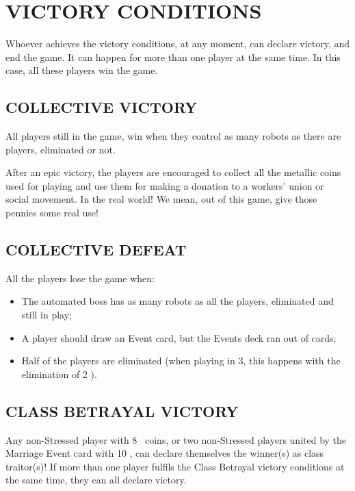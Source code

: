 \section{VICTORY CONDITIONS}

    Whoever achieves the victory conditions, at any moment, can declare victory,
    and end the game. It can happen for more than one player at the same time. In
    this case, all these players win the game.

    \subsection{COLLECTIVE VICTORY}
    
        All players still in the game, win when they control as many robots as there are
        players, eliminated or not.

        After an epic victory, the players are encouraged to collect all the metallic coins
        used for playing and use them for making a donation to a workers' union or social
        movement. In the real world! We mean, out of this game, give those pennies
        some real use!
    
    \subsection{COLLECTIVE DEFEAT}
    
        All the players lose the game when:
        \begin{itemize}
            \item The automated boss has as many robots as all the players, eliminated
            and still in play;
            \item A player should draw an Event card, but the Events deck ran out of cards;
            \item Half of the players are eliminated (when playing in 3, this happens with the
            elimination of 2 \faPeopleGroup).
        \end{itemize}
    
    \subsection{CLASS BETRAYAL VICTORY}
    
        Any non-Stressed player with 8 \faRubleSign\ coins, or two non-Stressed players united by
        the Marriage Event card with 10 \faRubleSign, can declare themselves the winner(s) as class
        traitor(s)!
        If more than one player fulfils the Class Betrayal victory conditions at the same
        time, they can all declare victory.



